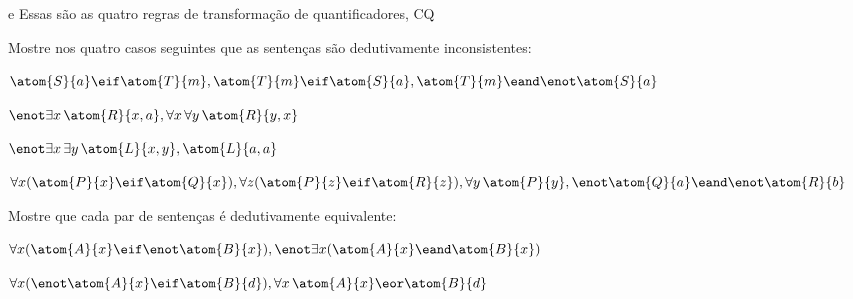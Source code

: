  
e
Essas s\~ao  as quatro regras de transforma\c c\~ao de quantificadores,  CQ


\practiceproblems
\problempart
 Mostre nos quatro casos seguintes que as senten\c cas s\~ao dedutivamente inconsistentes:
\begin{earg}
\item $\atom{S}{a}\eif \atom{T}{m}, \atom{T}{m} \eif \atom{S}{a}, \atom{T}{m} \eand \enot \atom{S}{a}$
\item $\enot\exists x\,\atom{R}{x,a}, \forall x\, \forall y\,\atom{R}{y,x}$
\item $\enot\exists x\, \exists y\,\atom{L}{x,y}, \atom{L}{a,a}$
\item $\forall x(\atom{P}{x} \eif \atom{Q}{x}), \forall z(\atom{P}{z} \eif \atom{R}{z}), \forall y\,\atom{P}{y}, \enot \atom{Q}{a} \eand \enot \atom{R}{b}$
\end{earg}

\problempart
Mostre que cada par de senten\c cas \'e dedutivamente equivalente:
\begin{earg}
\item $\forall x (\atom{A}{x}\eif \enot \atom{B}{x}), \enot\exists x(\atom{A}{x} \eand \atom{B}{x})$
\item $\forall x (\enot\atom{A}{x}\eif \atom{B}{d}), \forall x\,\atom{A}{x} \eor \atom{B}{d}$
\end{earg}

